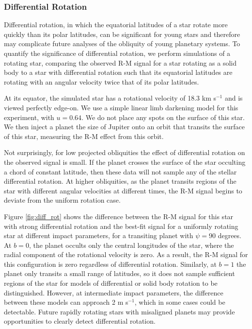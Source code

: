 \documentclass[twocolumn]{aastex63}
\begin{document}
\subsubsection{Differential Rotation}



Differential rotation, in which the equatorial latitudes of a star rotate more quickly than its polar latitudes, can be significant for young stars \citep{Waite17} and therefore may complicate future analyses of the obliquity of young planetary systems.
To quantify the significance of differential rotation, we perform simulations of a rotating star, comparing the observed R-M signal for a star rotating as a solid body to a star with differential rotation such that its equatorial latitudes are rotating with an angular velocity twice that of its polar latitudes. 

At its equator, the simulated star has a rotational velocity of 18.3 km s$^{-1}$ and is viewed perfectly edge-on.
We use a simple linear limb darkening model for this experiment, with $u = 0.64$. 
We do not place any spots on the surface of this star.
We then inject a planet the size of Jupiter onto an orbit that transits the surface of this star, measuring the R-M effect from this orbit.

Not surprisingly, for low projected obliquities the effect of differential rotation on the observed signal is small. If the planet crosses the surface of the star occulting a chord of constant latitude, then these data will not sample any of the stellar differential rotation. 
At higher obliquities, as the planet transits regions of the star with different angular velocities at different times, the R-M signal begins to deviate from the uniform rotation case.

Figure \ref{fig:diff_rot} shows the difference between the R-M signal for this star with strong differential rotation and the best-fit signal for a uniformly rotating star at different impact parameters, for a transiting planet with $\psi = 90$ degrees.
At $b=0$, the planet occults only the central longitudes of the star, where the radial component of the rotational velocity is zero. As a result, the R-M signal for this configuration is zero regardless of differential rotation.
Similarly, at $b=1$ the planet only transits a small range of latitudes, so it does not sample sufficient regions of the star for models of differential or solid body rotation to be distinguished.
However, at intermediate impact parameters, the difference between these models can approach 2 m s$^{-1}$, which in some cases could be detectable. 
Future rapidly rotating stars with misaligned planets may provide opportunities to clearly detect differential rotation.
\end{document}
